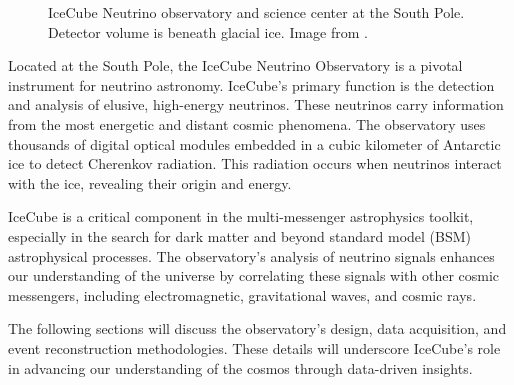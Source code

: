 \begin{figure}[h!]
    \caption{IceCube Neutrino observatory and science center at the South Pole. Detector volume is beneath glacial ice. Image from \cite{IceCube_SPGallery}.}
    \label{fig:IC3_atPole}
\end{figure}

Located at the South Pole, the IceCube Neutrino Observatory is a pivotal instrument for neutrino astronomy.
IceCube's primary function is the detection and analysis of elusive, high-energy neutrinos.
These neutrinos carry information from the most energetic and distant cosmic phenomena.
The observatory uses thousands of digital optical modules embedded in a cubic kilometer of Antarctic ice to detect Cherenkov radiation.
This radiation occurs when neutrinos interact with the ice, revealing their origin and energy.

IceCube is a critical component in the multi-messenger astrophysics toolkit, especially in the search for dark matter and beyond standard model (BSM) astrophysical processes.
The observatory's analysis of neutrino signals enhances our understanding of the universe by correlating these signals with other cosmic messengers, including electromagnetic, gravitational waves, and cosmic rays.

The following sections will discuss the observatory's design, data acquisition, and event reconstruction methodologies.
These details will underscore IceCube's role in advancing our understanding of the cosmos through data-driven insights.

